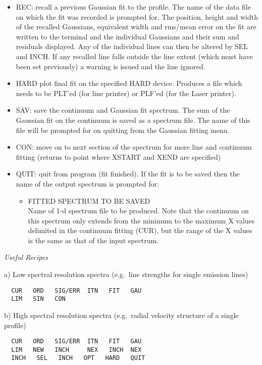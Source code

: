 \begin{itemize}
\item REC: recall a previous Gaussian fit to the profile. The name of
   the data file on which the fit was recorded is prompted for. The
   position, height and width of the recalled Gaussians, equivalent
   width and rms/mean error on the fit are written to the terminal and
   the individual Gaussians and their sum and residuals displayed. Any
   of the individual lines can then be altered by SEL and INCH. If any
   recalled line falls outside the line extent (which must have been set
   previously) a warning is issued and the line ignored.
\item HARD plot final fit on the specified HARD device. Produces a file
   which needs to be PLT'ed (for line printer) or PLF'ed (for the Laser
   printer).
\item SAV: save the continuum and Gaussian fit spectrum. The sum of the
   Gaussian fit on the continuum is saved as a spectrum file. The name
   of this file will be prompted for on quitting from the Gaussian
   fitting menu.
\item CON: move on to next section of the spectrum for more line and
   continuum fitting (returns to point where XSTART and XEND are
   specified)
\item QUIT: quit from program (fit finished).  If the fit is to be saved
   then the name of the output spectrum is prompted for:
   \begin{itemize}
   \item FITTED SPECTRUM TO BE SAVED\\
      Name of 1-d spectrum file to be produced. Note that the continuum
      on this spectrum only extends from the minimum to the maximum X values 
      delimited in the continuum fitting (CUR), but the range of the X values
      is the same as that of the input spectrum. 
   \end{itemize}
\end{itemize}


\goodbreak
\vspace{12pt}
{\it Useful Recipes}

a) Low spectral resolution spectra (e.g.\ line strengths for single 
emission lines)
\begin{verbatim}
  CUR   ORD   SIG/ERR  ITN   FIT   GAU
  LIM   SIN   CON
\end{verbatim}
b) High spectral resolution spectra (e.g.\ radial velocity structure of 
a single profile)
\begin{verbatim}
  CUR   ORD   SIG/ERR  ITN   FIT   GAU
  LIM   NEW   INCH     NEX   INCH  NEX
  INCH   SEL   INCH   OPT   HARD   QUIT
\end{verbatim}


